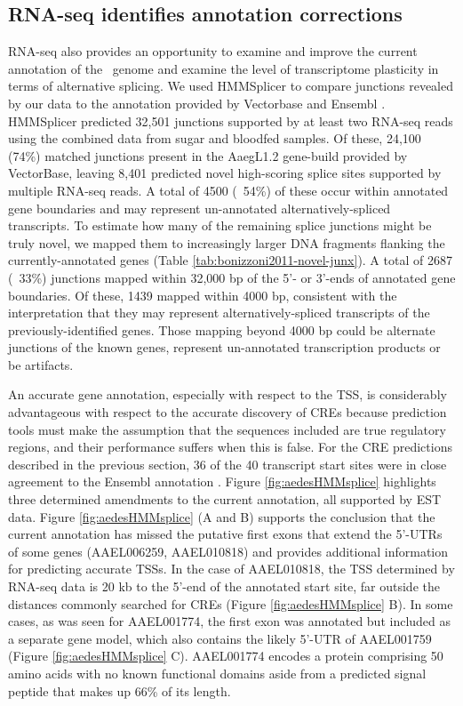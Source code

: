 \subsection{RNA-seq identifies annotation corrections}
RNA-seq also provides an opportunity to examine and improve the current annotation of the \Aa\  genome and examine the level of transcriptome plasticity in terms of alternative splicing. We used HMMSplicer \cite{Sieglaff2009} to compare junctions revealed by our data to the annotation provided by Vectorbase and Ensembl \cite{Lawson2009,Hubbard2002}. HMMSplicer predicted 32,501 junctions supported by at least two RNA-seq reads using the combined data from sugar and bloodfed samples. Of these, 24,100 (74\%) matched junctions present in the AaegL1.2 gene-build provided by VectorBase, leaving 8,401 predicted novel high-scoring splice sites supported by multiple RNA-seq reads. A total of 4500 (~54\%) of these occur within annotated gene boundaries and may represent un-annotated alternatively-spliced transcripts. To estimate how many of the remaining splice junctions might be truly novel, we mapped them to increasingly larger DNA fragments flanking the currently-annotated genes (Table \ref{tab:bonizzoni2011-novel-junx}). A total of 2687 (~33\%) junctions mapped within 32,000 bp of the 5'- or 3'-ends of annotated gene boundaries. Of these, 1439 mapped within 4000 bp, consistent with the interpretation that they may represent alternatively-spliced transcripts of the previously-identified genes. Those mapping beyond 4000 bp could be alternate junctions of the known genes, represent un-annotated transcription products or be artifacts.


An accurate gene annotation, especially with respect to the \gls{TSS}, is considerably advantageous with respect to the accurate discovery of \glspl{CRE} because prediction tools must make the assumption that the sequences included are true regulatory regions, and their performance suffers when this is false. For the \gls{CRE} predictions described in the previous section, 36 of the 40 transcript start sites were in close agreement to the Ensembl annotation \cite{Hubbard2002}. Figure \ref{fig:aedesHMMsplice} highlights three determined amendments to the current annotation, all supported by EST data. Figure \ref{fig:aedesHMMsplice} (A and B) supports the conclusion that the current annotation has missed the putative first exons that extend the 5'-UTRs of some genes (AAEL006259, AAEL010818) and provides additional information for predicting accurate \glspl{TSS}. In the case of AAEL010818, the \gls{TSS} determined by RNA-seq data is 20 kb to the 5'-end of the annotated start site, far outside the distances commonly searched for \glspl{CRE} (Figure \ref{fig:aedesHMMsplice} B). In some cases, as was seen for AAEL001774, the first exon was annotated but included as a separate gene model, which also contains the likely 5'-UTR of AAEL001759 (Figure \ref{fig:aedesHMMsplice} C). AAEL001774 encodes a protein comprising 50 amino acids with no known functional domains aside from a predicted signal peptide that makes up 66\% of its length.

